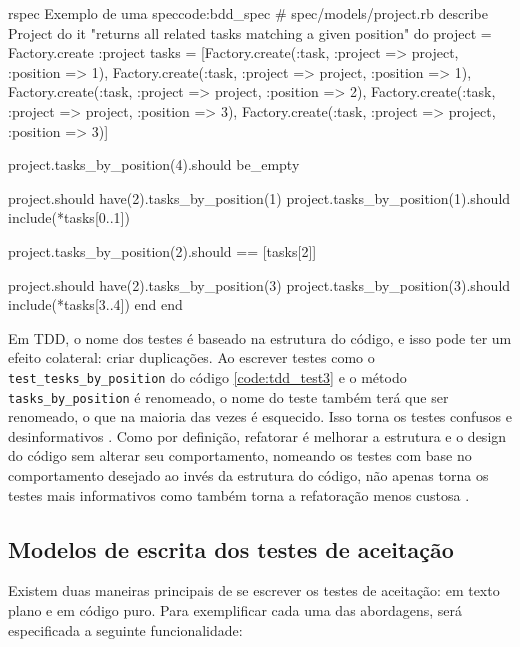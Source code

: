 \begin{mycode}{rspec}%
{Exemplo de uma spec}{code:bdd_spec}
# spec/models/project.rb
describe Project do
  it "returns all related tasks matching a given position" do
    project = Factory.create :project
    tasks = [Factory.create(:task, :project => project, :position => 1),
             Factory.create(:task, :project => project, :position => 1),
             Factory.create(:task, :project => project, :position => 2),
             Factory.create(:task, :project => project, :position => 3),
             Factory.create(:task, :project => project, :position => 3)]

    project.tasks_by_position(4).should be_empty

    project.should have(2).tasks_by_position(1)
    project.tasks_by_position(1).should include(*tasks[0..1])

    project.tasks_by_position(2).should == [tasks[2]]

    project.should have(2).tasks_by_position(3)
    project.tasks_by_position(3).should include(*tasks[3..4])
  end
end
\end{mycode}

Em TDD, o nome dos testes é baseado na estrutura do código, e isso pode ter um efeito colateral: criar duplicações. Ao escrever testes como o \texttt{test\_tesks\_by\_position} do código \ref{code:tdd_test3} e o método \texttt{tasks\_by\_position} é renomeado, o nome do teste também terá que ser renomeado, o que na maioria das vezes é esquecido. Isso torna os testes confusos e desinformativos \cite{ContinuousTesting}. Como por definição, refatorar é melhorar a estrutura e o design do código sem alterar seu comportamento, nomeando os testes com base no comportamento desejado ao invés da estrutura do código, não apenas torna os testes mais informativos como também torna a refatoração menos custosa \cite{ContinuousTesting}.



\subsection{Modelos de escrita dos testes de aceitação}
\label{sub:modelos_de_escrita_dos_testes_de_aceitacao}

Existem duas maneiras principais de se escrever os testes de aceitação: em texto plano e em código puro. Para exemplificar cada uma das abordagens, será especificada a seguinte funcionalidade:

